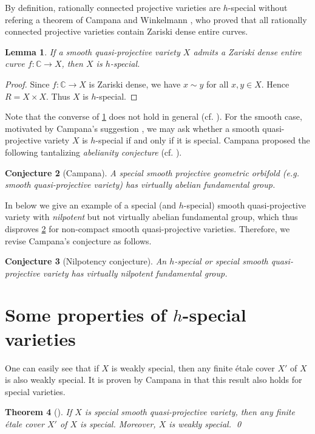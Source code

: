 \documentclass[11pt,english]{smfart}
\theoremstyle{plain}
\newtheorem{thm}{Theorem}[section]
\newtheorem{lem}[thm]{Lemma}
\newtheorem{conjecture}[thm]{Conjecture}
\theoremstyle{definition}
\theoremstyle{remark}
\numberwithin{equation}{subsection}
\theoremstyle{plain}
\begin{document}
By definition, rationally connected projective varieties are $h$-special without refering a theorem of Campana and Winkelmann \cite{CW16}, who proved that all rationally connected projective varieties contain Zariski dense entire curves.  

\begin{lem}\label{lem:20230406}
If a smooth quasi-projective variety $X$ admits a Zariski dense entire curve $f:\mathbb C\to X$, then $X$ is $h$-special.
\end{lem}

\begin{proof}
Since $f:\mathbb C\to X$ is Zariski dense, we have $x\sim y$ for all $x,y\in X$.
Hence $R=X\times X$.
Thus $X$ is $h$-special.
\end{proof}

Note that the converse of \cref{lem:20230406} does not hold in general (cf. ).
For the smooth case, motivated by Campana's suggestion \cite[11.3 (5)]{Cam11b}, we may ask whether a smooth quasi-projective variety $X$ is $h$-special  if and only if it is special. 
Campana proposed the following tantalizing \emph{abelianity conjecture} (cf. \cite[11.2]{Cam11b}).
 \begin{conjecture}[Campana]\label{conj:Campana}
 	A special smooth projective geometric orbifold   (e.g. smooth quasi-projective variety)  has \emph{virtually abelian} fundamental group.  
 \end{conjecture}
 In   below we give an example of a special (and $h$-special) smooth quasi-projective variety with \emph{nilpotent} but not virtually abelian fundamental group, which thus disproves \cref{conj:Campana} for non-compact smooth quasi-projective varieties. Therefore, we revise Campana's conjecture as follows. 
 \begin{conjecture}[Nilpotency conjecture]\label{conj:revised}
 	An $h$-special or   special smooth quasi-projective variety has \emph{virtually nilpotent} fundamental group.  
 \end{conjecture} 



\section{Some properties of $h$-special varieties}\label{sec:20230406}
One can easily see that if $X$ is weakly special, then any finite \'etale cover $X'$ of $X$ is also weakly special.  
It is proven by Campana in \cite{Cam11} that this result also holds for special varieties. 
\begin{thm}[{\cite[Proposition 10.11]{Cam11}}]\label{special} 
If $X$ is  special smooth quasi-projective variety, then any finite \'etale cover $X'$ of $X$ is  special. Moreover, $X$ is weakly special.  \qed
\end{thm} 
\end{document}
